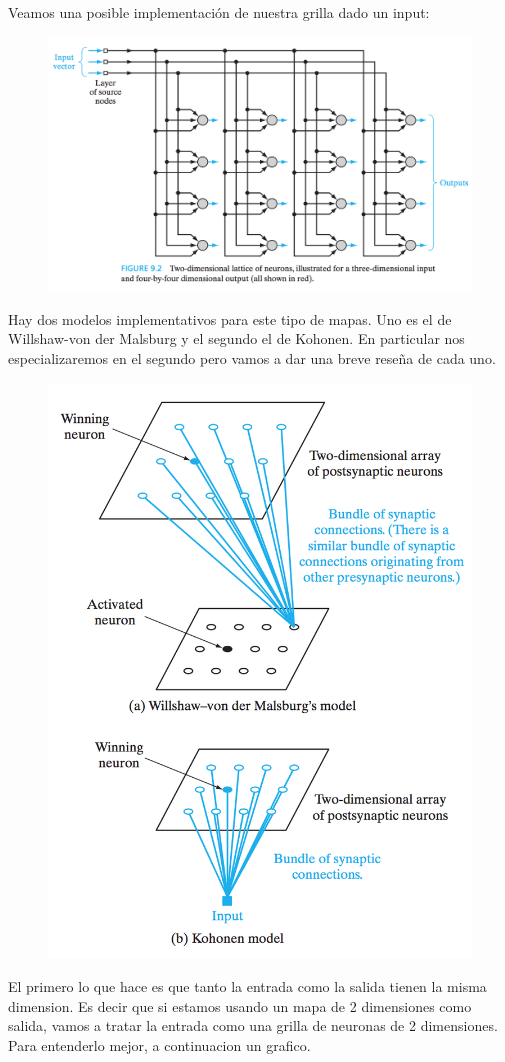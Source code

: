 Veamos una posible implementación de nuestra grilla dado un input:

\begin{figure}[h!]
  \centering
  \includegraphics[width=.6\linewidth]{img/som/implementacion}
\label{fig:test}
\end{figure}

\pagebreak
Hay dos modelos implementativos para este tipo de mapas. Uno es el de Willshaw-von der Malsburg y el segundo el de Kohonen. En particular nos especializaremos en el segundo pero vamos a dar una breve reseña de cada uno.

\begin{figure}[h!]
  \centering
  \includegraphics[width=.6\linewidth]{img/som/modelos}
\label{fig:test}
\end{figure}


El primero lo que hace es que tanto la entrada como la salida tienen la misma dimension. Es decir que si estamos usando un mapa de 2 dimensiones como salida, vamos a tratar la entrada como una grilla de neuronas de 2 dimensiones. Para entenderlo mejor, a continuacion un grafico.



